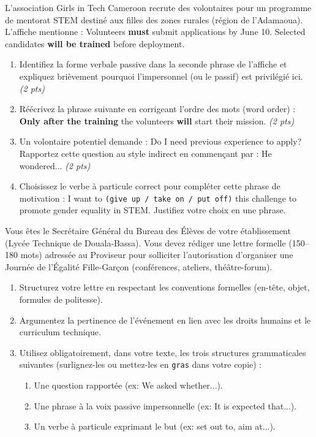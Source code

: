 \documentclass[11pt]{article}
\begin{document}
\begin{exercice}
L'association \og Girls in Tech Cameroon \fg{} recrute des volontaires pour un programme de mentorat STEM destiné aux filles des zones rurales (région de l'Adamaoua). L'affiche mentionne : \og Volunteers \textbf{must} submit applications by June 10. Selected candidates \textbf{will be trained} before deployment.\fg{}

\begin{enumerate}
\item Identifiez la forme verbale passive dans la seconde phrase de l'affiche et expliquez brièvement pourquoi l'impersonnel (ou le passif) est privilégié ici. \textit{(2 pts)}
\item Réécrivez la phrase suivante en corrigeant l'ordre des mots (word order) : \og \textbf{Only after the training} the volunteers \textbf{will} start their mission.\fg{} \textit{(2 pts)}
\item Un volontaire potentiel demande : \og Do I need previous experience to apply?\fg{} Rapportez cette question au style indirect en commençant par : \og He wondered...\fg{} \textit{(2 pts)}
\item Choisissez le verbe à particule correct pour compléter cette phrase de motivation : \og I want to \texttt{(give up / take on / put off)} this challenge to promote gender equality in STEM.\fg{} Justifiez votre choix en une phrase.
\end{enumerate}
\end{exercice}

\begin{exercice}
Vous êtes le Secrétaire Général du Bureau des Élèves de votre établissement (Lycée Technique de Douala-Bassa). Vous devez rédiger une lettre formelle (150--180 mots) adressée au Proviseur pour solliciter l'autorisation d'organiser une \og Journée de l'Égalité Fille-Garçon \fg{} (conférences, ateliers, théâtre-forum).

\begin{enumerate}
\item Structurez votre lettre en respectant les conventions formelles (en-tête, objet, formules de politesse).
\item Argumentez la pertinence de l'événement en lien avec les droits humains et le curriculum technique.
\item Utilisez obligatoirement, dans votre texte, les trois structures grammaticales suivantes (surlignez-les ou mettez-les en \texttt{gras} dans votre copie) :
\begin{enumerate}
\item Une question rapportée (ex: \og We asked whether...\fg{}).
\item Une phrase à la voix passive impersonnelle (ex: \og It is expected that...\fg{}).
\item Un verbe à particule exprimant le but (ex: \og set out to, aim at...\fg{}).
\end{enumerate}
\end{enumerate}
\end{exercice}
\end{document}
